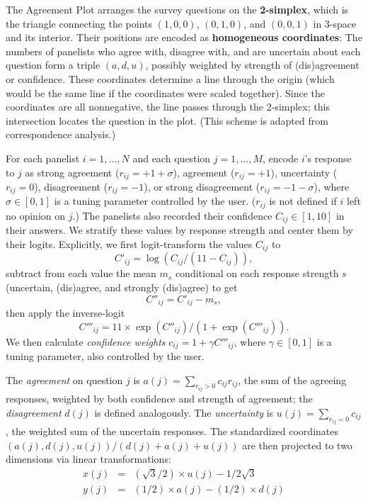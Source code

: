 \documentclass{article}
\begin{document}
The Agreement Plot arranges the survey questions on the {\bf 2-simplex}, which is the triangle connecting the points \((1,0,0)\), \((0,1,0)\), and \((0,0,1)\) in 3-space and its interior. Their positions are encoded as {\bf homogeneous coordinates}: The numbers of panelists who agree with, disagree with, and are uncertain about each question form a triple \((a,d,u)\), possibly weighted by strength of (dis)agreement or confidence. These coordinates determine a line through the origin (which would be the same line if the coordinates were scaled together). Since the coordinates are all nonnegative, the line passes through the 2-simplex; this intersection locates the question in the plot. (This scheme is adapted from correspondence analysis.)

For each panelist \(i=1,\ldots,N\) and each question \(j=1,\ldots,M\), encode \(i\)'s response to \(j\) as strong agreement (\(r_{ij}=+1+\sigma\)), agreement (\(r_{ij}=+1\)), uncertainty (\(r_{ij}=0\)), disagreement (\(r_{ij}=-1\)), or strong disagreement (\(r_{ij}=-1-\sigma\)), where \(\sigma\in[0,1]\) is a tuning parameter controlled by the user. (\(r_{ij}\) is not defined if \(i\) left no opinion on \(j\).) The panelists also recorded their confidence \(C_{ij}\in[1,10]\) in their answers. We stratify these values by response strength and center them by their logits. Explicitly, we first logit-transform the values \(C_{ij}\) to
\[C'_{ij}=\log({C_{ij}}/{(11-C_{ij})}),\]
subtract from each value the mean \(m_s\) conditional on each response strength \(s\) (uncertain, (dis)agree, and strongly (dis)agree) to get
\[C''_{ij}=C'_{ij}-m_s,\]
then apply the inverse-logit 
\[C'''_{ij}=11\times\exp(C''_{ij})/(1+\exp(C'''_{ij})).\]
We then calculate {\em confidence weights} \(c_{ij}=1+\gamma C'''_{ij}\), where \(\gamma\in[0,1]\) is a tuning parameter, also controlled by the user.

The {\em agreement} on question \(j\) is \(a(j)=\sum_{r_{ij}>0}{c_{ij}r_{ij}}\), the sum of the agreeing responses, weighted by both confidence and strength of agreement; the {\em disagreement} \(d(j)\) is defined analogously. The {\em uncertainty} is \(u(j)=\sum_{r_{ij}=0}{c_{ij}}\), the weighted sum of the uncertain responses. The standardized coordinates \((a(j),d(j),u(j))/(d(j)+a(j)+u(j))\) are then projected to two dimensions via linear transformations:
\begin{eqnarray*}
x(j) &= &({\sqrt{3}}/{2})\times u(j) - {1}/{2\sqrt{3}} \\
y(j) &= &({1}/{2})\times a(j) - ({1}/{2})\times d(j)
\end{eqnarray*}
\end{document}
